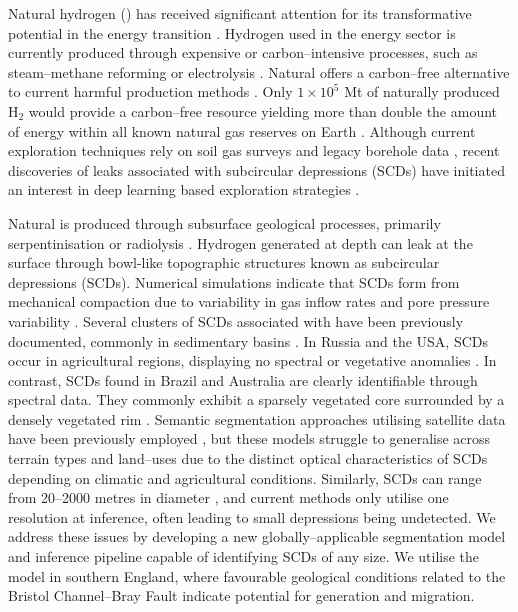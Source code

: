 \documentclass[12pt]{article}
\begin{document}
Natural hydrogen () has received significant attention for its transformative potential in the energy transition \cite{Ellis2024}. Hydrogen used in the energy sector is currently produced through expensive or carbon--intensive processes, such as steam--methane reforming or electrolysis \cite{IEA_2025}. Natural  offers a carbon--free alternative to current harmful production methods \cite{WhiteHydrogenReview}. Only $1 \times10^5$ Mt of naturally produced H$_2$ would provide a carbon--free resource yielding more than double the amount of energy within all known natural gas reserves on Earth \cite{Ellis2024}. Although current  exploration techniques rely on soil gas surveys and legacy borehole data \cite{WhiteHydrogenReview}, recent discoveries of  leaks associated with subcircular depressions (SCDs) \cite{Australia, Brazil, Russia, zgonnik, Morrocco} have initiated an interest in deep learning based exploration strategies \cite{NG, ROCHE2026107617}. 

Natural  is produced through subsurface geological processes, primarily serpentinisation or radiolysis \cite{WhiteHydrogenReview, christiansen}. Hydrogen generated at depth can leak at the surface through bowl-like topographic structures known as subcircular depressions (SCDs). Numerical simulations indicate that SCDs form from mechanical compaction due to variability in gas inflow rates and pore pressure variability \cite{SCD1}. Several clusters of SCDs associated with  have been previously documented, commonly in sedimentary basins \cite{Russia, Brazil, Morrocco, Australia, zgonnik}. In Russia and the USA, SCDs occur in agricultural regions, displaying no spectral or vegetative anomalies \cite{Russia, zgonnik}. In contrast, SCDs found in Brazil and Australia are clearly identifiable through spectral data. They commonly exhibit a sparsely vegetated core surrounded by a densely vegetated rim \cite{Australia, Brazil}. Semantic segmentation approaches utilising satellite data have been previously employed \cite{ROCHE2026107617, NG}, but these models struggle to generalise across terrain types and land--uses due to the distinct optical characteristics of SCDs depending on climatic and agricultural conditions. Similarly, SCDs can range from 20--2000 metres in diameter \cite{Russia, Australia, Brazil, SCD1}, and current methods only utilise one resolution at inference, often leading to small depressions being undetected. We address these issues by developing a new globally--applicable segmentation model and inference pipeline capable of identifying SCDs of any size. We utilise the model in southern England, where favourable geological conditions related to the Bristol Channel--Bray Fault indicate potential for  generation and migration. 
\end{document}
